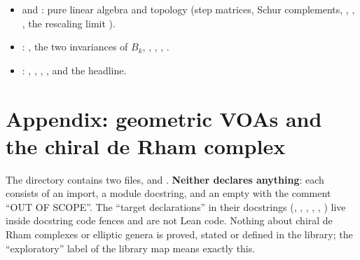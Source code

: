 \begin{itemize}
  nonzero step minors, clause (vi) $\iff$ matrix layer signs.
\item {} and : pure
  linear algebra and topology (step matrices, Schur complements, , ,
  , the rescaling limit ).
\item {}: , the two invariances of $B_k$,
  , , , .
\item {}: , ,
  , , and the headline.
\end{itemize}
\endgroup



\section{Appendix: geometric VOAs and the chiral de Rham complex}\label{l19:sec:geometric}

The directory  contains two files,
 and .
\textbf{Neither declares anything}: each consists of an import, a module docstring, and an empty
 with the comment ``OUT OF SCOPE''. The ``target declarations'' in their
docstrings (, , , ,
, ) live inside docstring code fences and are not Lean code. Nothing
about chiral de Rham complexes or elliptic genera is proved, stated or defined in the library; the
``exploratory'' label of the library map means exactly this.

